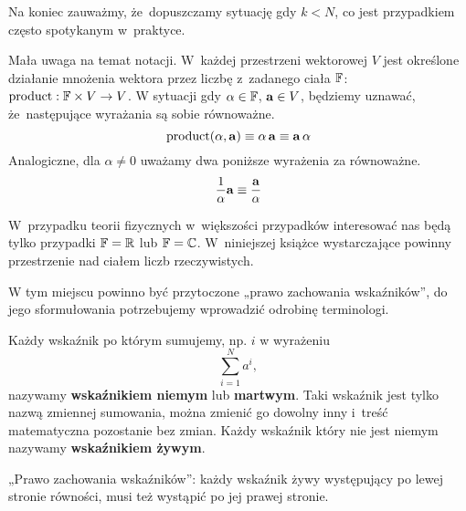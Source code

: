 \documentclass[a4paper,11pt]{article}
\numberwithin{equation}{section}
\begin{document}
Na koniec zauważmy, że~dopuszczamy sytuację gdy $k < N$, co jest przypadkiem
często spotykanym w~praktyce.

\vspace{\spaceFour}





\noindent
{} Mała uwaga na temat notacji. W~każdej przestrzeni wektorowej $V$
jest określone działanie mnożenia wektora przez liczbę z~zadanego
ciała $\mathbb{F}$: $\textrm{product} : \mathbb{F} \times V \to V$. W sytuacji gdy $\alpha \in \mathbb{F}$,
$\mathbf{a} \in V$, będziemy uznawać, że~następujące wyrażania są sobie
równoważne.
\begin{equation}
  \label{eq:SkalmierskiMechanika-03}
  \textrm{product}( \alpha, \mathbf{a} ) \equiv \alpha \, \mathbf{a} \equiv \mathbf{a} \, \alpha
\end{equation}
Analogiczne, dla $\alpha \neq 0$ uważamy dwa poniższe wyrażenia za równoważne.
\begin{equation}
  \label{eq:SkalmierskiMechanika-04}
  \frac{ 1 }{ \alpha } \mathbf{a} \equiv \frac{ \mathbf{a} }{ \alpha }
\end{equation}

W~przypadku teorii fizycznych w~większości przypadków interesować nas będą
tylko przypadki $\mathbb{F} = \mathbb{R}$ lub $\mathbb{F} = \mathbb{C}$. W~niniejszej książce
wystarczające powinny przestrzenie nad ciałem liczb rzeczywistych.

\vspace{\spaceFour}





\noindent
{} W tym miejscu powinno być przytoczone „prawo zachowania
wskaźników”, do jego sformułowania potrzebujemy wprowadzić odrobinę
terminologi.

Każdy wskaźnik po którym sumujemy, np. $i$ w wyrażeniu
\begin{equation}
  \label{eq:SkalmierskiMechanika-05}
  \sum_{ i = 1 }^{ N } a^{ i },
\end{equation}
nazywamy \textbf{wskaźnikiem niemym} lub \textbf{martwym}. Taki wskaźnik
jest tylko nazwą zmiennej sumowania, można zmienić go dowolny inny i~treść
matematyczna pozostanie bez zmian. Każdy wskaźnik który nie jest niemym
nazywamy \textbf{wskaźnikiem żywym}.

„Prawo zachowania wskaźników”: każdy wskaźnik żywy występujący po lewej
stronie równości, musi też wystąpić po jej prawej stronie.

\vspace{\spaceFour}
\end{document}
